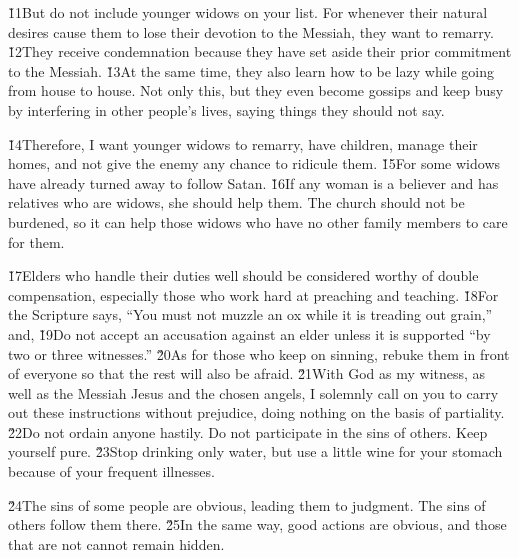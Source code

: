 \v{11}But do not include younger widows on your list. For whenever their natural desires cause them to lose their devotion to the Messiah, they want to remarry. \v{12}They receive condemnation because they have set aside their prior commitment to the Messiah. \v{13}At the same time, they also learn how to be lazy while going from house to house. Not only this, but they even become gossips and keep busy by interfering in other people's lives, saying things they should not say.

\v{14}Therefore, I want younger widows to remarry, have children, manage their homes, and not give the enemy any chance to ridicule them. \v{15}For some widows have already turned away to follow Satan. \v{16}If any woman is a believer and has relatives who are widows, she should help them. The church should not be burdened, so it can help those widows who have no other family members to care for them.

\v{17}Elders who handle their duties well should be considered worthy of double compensation, especially those who work hard at preaching and teaching. \v{18}For the Scripture says, ``You must not muzzle an ox while it is treading out grain,'' and,  \v{19}Do not accept an accusation against an elder unless it is supported ``by two or three witnesses.'' \v{20}As for those who keep on sinning, rebuke them in front of everyone so that the rest will also be afraid. \v{21}With God as my witness, as well as the Messiah Jesus and the chosen angels, I solemnly call on you to carry out these instructions without prejudice, doing nothing on the basis of partiality. \v{22}Do not ordain anyone hastily. Do not participate in the sins of others. Keep yourself pure. \v{23}Stop drinking only water, but use a little wine for your stomach because of your frequent illnesses.

\v{24}The sins of some people are obvious, leading them to judgment. The sins of others follow them there. \v{25}In the same way, good actions are obvious, and those that are not cannot remain hidden.

